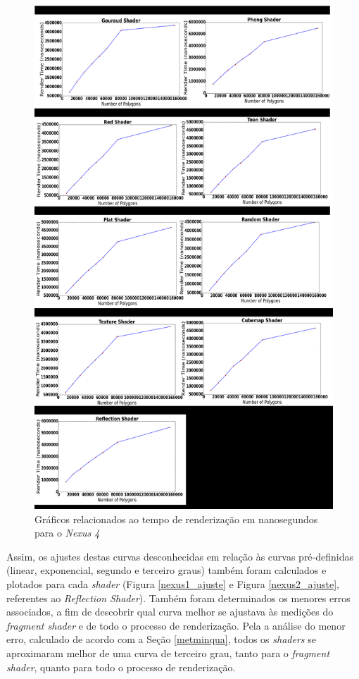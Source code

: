 	\begin{figure}[ht]
	\centering
		\includegraphics[keepaspectratio=true,scale=0.35]{figuras/render_time.png}
	\caption{Gráficos relacionados ao tempo de renderização em nanosegundos para o \textit{Nexus 4}}
	\label{nexus3}
	\end{figure}	


	 Assim, os ajustes destas curvas desconhecidas em relação às curvas pré-definidas (linear, exponencial, segundo e terceiro graus) também foram calculados e plotados para cada \textit{shader} (Figura \ref{nexus1_ajuste} e Figura \ref{nexus2_ajuste}, referentes ao \textit{Reflection Shader}). Também foram determinados os menores erros associados, a fim de descobrir qual curva melhor se ajustava às medições do \textit{fragment shader} e de todo o processo de renderização. Pela a análise do menor erro, calculado de acordo com a Seção \ref{metminqua}, todos os \textit{shaders} se aproximaram melhor de uma curva de terceiro grau, tanto para o \textit{fragment shader}, quanto para todo o processo de renderização.
	
